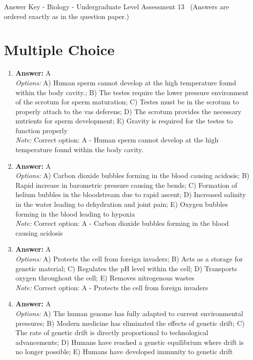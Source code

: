 \documentclass[12pt]{article}
\begin{document}
\begin{center}
Answer Key - Biology - Undergraduate Level Assessment 13 \
\small (Answers are ordered exactly as in the question paper.)
\end{center}

\section*{Multiple Choice}
\begin{enumerate}[label=\arabic*.]
\item \textbf{Answer:} A
\\ \textit{Options:} A) Human sperm cannot develop at the high temperature found within the body cavity.; B) The testes require the lower pressure environment of the scrotum for sperm maturation; C) Testes must be in the scrotum to properly attach to the vas deferens; D) The scrotum provides the necessary nutrients for sperm development; E) Gravity is required for the testes to function properly
\\ \textit{Note:} Correct option: A - Human sperm cannot develop at the high temperature found within the body cavity.
\item \textbf{Answer:} A
\\ \textit{Options:} A) Carbon dioxide bubbles forming in the blood causing acidosis; B) Rapid increase in barometric pressure causing the bends; C) Formation of helium bubbles in the bloodstream due to rapid ascent; D) Increased salinity in the water leading to dehydration and joint pain; E) Oxygen bubbles forming in the blood leading to hypoxia
\\ \textit{Note:} Correct option: A - Carbon dioxide bubbles forming in the blood causing acidosis
\item \textbf{Answer:} A
\\ \textit{Options:} A) Protects the cell from foreign invaders; B) Acts as a storage for genetic material; C) Regulates the pH level within the cell; D) Transports oxygen throughout the cell; E) Removes nitrogenous wastes
\\ \textit{Note:} Correct option: A - Protects the cell from foreign invaders
\item \textbf{Answer:} A
\\ \textit{Options:} A) The human genome has fully adapted to current environmental pressures; B) Modern medicine has eliminated the effects of genetic drift; C) The rate of genetic drift is directly proportional to technological advancements; D) Humans have reached a genetic equilibrium where drift is no longer possible; E) Humans have developed immunity to genetic drift

\end{enumerate}
\end{document}
